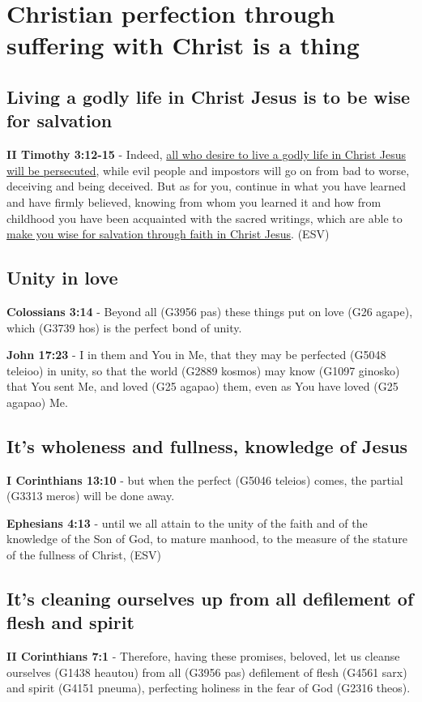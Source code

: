 \documentclass[11pt]{article}
\begin{document}
\section{Christian perfection through suffering with Christ is a thing}
\label{sec:org4f7bd6e}
\subsection{Living a godly life in Christ Jesus is to be wise for salvation}
\label{sec:orgf4f13e8}
\textbf{II Timothy 3:12-15} - Indeed, \uline{all who desire to live a godly life in Christ Jesus will be persecuted}, while evil people and impostors will go on from bad to worse, deceiving and being deceived. But as for you, continue in what you have learned and have firmly believed, knowing from whom you learned it and how from childhood you have been acquainted with the sacred writings, which are able to \uline{make you wise for salvation through faith in Christ Jesus}. (ESV)

\subsection{Unity in love}
\label{sec:orge30c0da}
\textbf{Colossians 3:14} - Beyond all (G3956 pas) these things put on love (G26 agape), which (G3739 hos) is the perfect bond of unity.

\textbf{John 17:23} - I in them and You in Me, that they may be perfected (G5048 teleioo) in unity, so that the world (G2889 kosmos) may know (G1097 ginosko) that You sent Me, and loved (G25 agapao) them, even as You have loved (G25 agapao) Me.

\subsection{It's wholeness and fullness, knowledge of Jesus}
\label{sec:org32633c0}
\textbf{I Corinthians 13:10} - but when the perfect (G5046 teleios) comes, the partial (G3313 meros) will be done away.

\textbf{Ephesians 4:13} - until we all attain to the unity of the faith and of the knowledge of the Son of God, to mature manhood, to the measure of the stature of the fullness of Christ, (ESV)

\subsection{It's cleaning ourselves up from all defilement of flesh and spirit}
\label{sec:orge4163d1}
\textbf{II Corinthians 7:1} - Therefore, having these promises, beloved, let us cleanse ourselves (G1438 heautou) from all (G3956 pas) defilement of flesh (G4561 sarx) and spirit (G4151 pneuma), perfecting holiness in the fear of God (G2316 theos).
\end{document}
